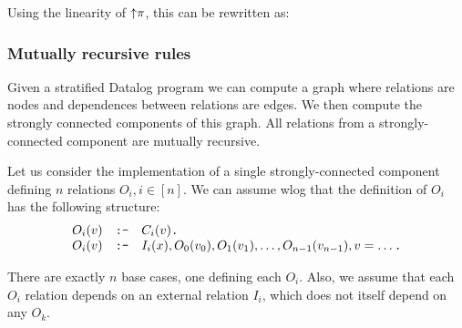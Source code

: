 Using the linearity of ${\uparrow}\pi$, this can be rewritten as:

\noindent
{}

\subsubsection{Mutually recursive rules}\label{sec:mutually-recursive}

Given a stratified Datalog program we can compute a graph where relations are nodes and dependences
between relations are edges.  We then compute the strongly connected components of this graph.
All relations from a strongly-connected component are mutually recursive.

Let us consider the implementation of a single strongly-connected component defining $n$
relations $O_i, i \in [n]$.  We can assume wlog that the definition of $O_i$ has the following
structure:
\newcommand{\tns}{\code{:-}}
\newcommand{\cd}{\code{.}}
$$
\begin{array}{lll}
O_i(v) &\tns& C_i(v)\cd \\
O_i(v) &\tns&  I_i(x), O_0(v_0), O_1(v_1), \ldots, O_{n-1}(v_{n-1}), v = \ldots \cd \\
\end{array}
$$

There are exactly $n$ base cases, one defining each $O_i$.  Also, we assume that each $O_i$ relation
depends on an external relation $I_i$, which does not itself depend on any $O_k$.

